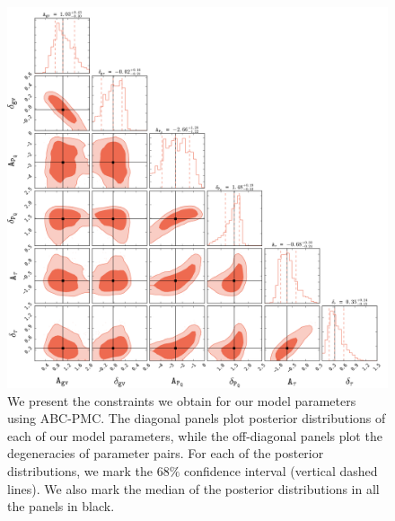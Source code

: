 \begin{figure}
\begin{center}
\includegraphics[width=\textwidth]{figs/cenq/abc_step7_multifq_wideprior_unweighted.pdf}
\caption{We present the constraints we obtain for our model parameters using ABC-PMC. 
The diagonal panels plot posterior distributions of each of our model parameters, while
the off-diagonal panels plot the degeneracies of parameter pairs. For each of the posterior
distributions, we mark the $68\%$ confidence interval (vertical dashed lines). We also 
mark the median of the posterior distributions in all the panels in black.}
\label{fig:abc_post}
\end{center}
\end{figure}
